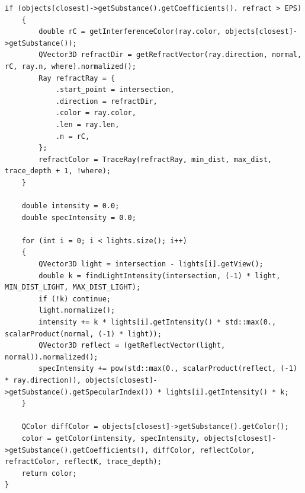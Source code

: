 \begin{center}
\captionsetup{justification=raggedright,singlelinecheck=off}
\begin{lstlisting}[label=lst:ray_2,caption=Трассировка лучей (часть 2),basicstyle=\ttfamily\footnotesize]
    if (objects[closest]->getSubstance().getCoefficients(). refract > EPS) 
    {
        double rC = getInterferenceColor(ray.color, objects[closest]->getSubstance());
        QVector3D refractDir = getRefractVector(ray.direction, normal, rC, ray.n, where).normalized();
        Ray refractRay = {
            .start_point = intersection,
            .direction = refractDir,
            .color = ray.color,
            .len = ray.len,
            .n = rC,
        };
        refractColor = TraceRay(refractRay, min_dist, max_dist, trace_depth + 1, !where);
    }

    double intensity = 0.0;
    double specIntensity = 0.0;

    for (int i = 0; i < lights.size(); i++) 
    {
        QVector3D light = intersection - lights[i].getView();
        double k = findLightIntensity(intersection, (-1) * light, MIN_DIST_LIGHT, MAX_DIST_LIGHT);
        if (!k) continue;
        light.normalize();
        intensity += k * lights[i].getIntensity() * std::max(0., scalarProduct(normal, (-1) * light));
        QVector3D reflect = (getReflectVector(light, normal)).normalized();
        specIntensity += pow(std::max(0., scalarProduct(reflect, (-1) * ray.direction)), objects[closest]->getSubstance().getSpecularIndex()) * lights[i].getIntensity() * k;
    }

    QColor diffColor = objects[closest]->getSubstance().getColor();
    color = getColor(intensity, specIntensity, objects[closest]->getSubstance().getCoefficients(), diffColor, reflectColor, refractColor, reflectK, trace_depth);
    return color;
}
\end{lstlisting}
\end{center}

\clearpage

